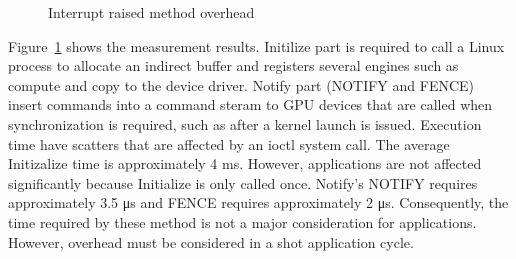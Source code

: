 \begin{figure}[!t]
\begin{center}
\caption{Interrupt raised method overhead}
\label{fig:irq_rise_overhead}
\end{center}
\end{figure}

Figure~\ref{fig:irq_rise_overhead} shows the measurement results.
Initilize part is required to call a Linux process to allocate an indirect buffer and registers several engines such as compute and copy to the device driver.
Notify part (NOTIFY and FENCE) insert commands into a command steram to GPU devices that are called when synchronization is required, such as after a kernel launch is issued.
Execution time have scatters that are affected by an ioctl system call.
The average Initizalize time is approximately 4 ms.
However, applications are not affected significantly because Initialize is only called once.
Notify’s NOTIFY requires approximately 3.5 μs and FENCE requires approximately 2 μs.
Consequently, the time required by these method is not a major consideration for applications.
However, overhead must be considered in a shot application cycle.

\label{sec:eval:sched_overhead}

